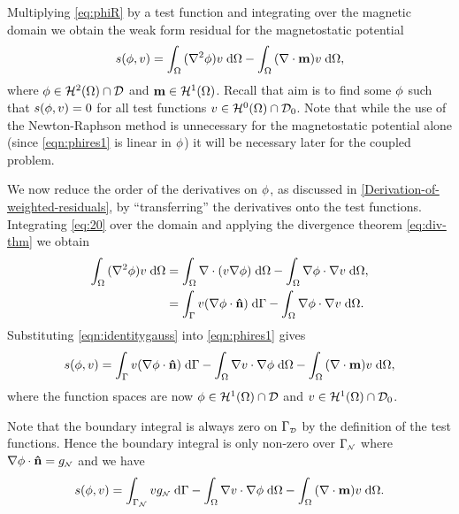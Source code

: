 {Multiplying \cref{eq:phiR} by a test function and integrating over the magnetic domain we obtain the weak form residual for the magnetostatic potential
\begin{gather}
  s(\phi, v) = {\int_{\Omega} { (\nabla^2 \phi) v } {\; \mathrm{{d}}} {\Omega}}
  - {\int_{\Omega} { (\nabla \cdot \boldsymbol{\mathrm{m}}) v} {\; \mathrm{{d}}} {\Omega}}, \label{eqn:phires1}
\end{gather}
where $\phi \in \mathcal{H}^2(\Omega) \cap \mathcal{D}$ and $\boldsymbol{\mathrm{m}} \in \mathcal{H}^1(\Omega)$.
Recall that aim is to find some $\phi$ such that $s(\phi, v) = 0$ for all test functions $v \in \mathcal{H}^0(\Omega) \cap \mathcal{D}_0$.
Note that while the use of the Newton-Raphson method is unnecessary for the magnetostatic potential alone (since \cref{eqn:phires1} is linear in $\phi$) it will be necessary later for the coupled problem.

We now reduce the order of the derivatives on $\phi$, as discussed in \cref{Derivation-of-weighted-residuals}, by ``transferring'' the derivatives onto the test functions.
Integrating \cref{eq:20} over the domain and applying the divergence theorem \cref{eq:div-thm} we obtain
\begin{equation}
  \begin{aligned}
    {\int_{\Omega} { (\nabla^2\phi) v} {\; \mathrm{{d}}}{\Omega}} &=  {\int_{\Omega} {\nabla \cdot (v \nabla \phi)} {\; \mathrm{{d}}} {\Omega}}
           - {\int_{\Omega} {\nabla \phi \cdot \nabla v} {\; \mathrm{{d}}} {\Omega}},\\
    &= {\int_{{\Gamma}} {v (\nabla \phi \cdot \boldsymbol{\mathrm{\hat{n}}})} {\; \mathrm{{d}}} {{\Gamma}}}
    - {\int_{\Omega} { \nabla \phi \cdot \nabla v} {\; \mathrm{{d}}} {\Omega}}.
    \label{eqn:identitygauss}
  \end{aligned}
\end{equation}
Substituting \cref{eqn:identitygauss} into \cref{eqn:phires1} gives
\begin{equation}
  s(\phi, v) = {\int_{{\Gamma}} { v (\nabla \phi \cdot \boldsymbol{\mathrm{\hat{n}}}) } {\; \mathrm{{d}}} {{\Gamma}}}
  - {\int_{\Omega} { \nabla v \cdot \nabla \phi } {\; \mathrm{{d}}} {\Omega}}
  - {\int_{\Omega} { (\nabla \cdot \boldsymbol{\mathrm{m}}) v } {\; \mathrm{{d}}} {\Omega}},
\end{equation}
where the function spaces are now $\phi \in \mathcal{H}^1(\Omega) \cap \mathcal{D}$ and $v \in \mathcal{H}^1(\Omega) \cap \mathcal{D}_0$.

Note that the boundary integral is always zero on ${\Gamma}_{\scriptscriptstyle{\mathcal{D}}}$ by the definition of the test functions.
Hence the boundary integral is only non-zero over ${\Gamma}_{{\scriptscriptstyle{\mathcal{N}}}}$ where $\nabla \phi \cdot \boldsymbol{\mathrm{\hat{n}}} = g_{{\scriptscriptstyle{\mathcal{N}}}}$ and we have
\begin{equation}
  s(\phi, v) = \int_{{\Gamma}_{\scriptscriptstyle{\mathcal{N}}}} v g_{\scriptscriptstyle{\mathcal{N}}} {\; \mathrm{{d}}} {\Gamma}
  - {\int_{\Omega} { \nabla v \cdot \nabla \phi} {\; \mathrm{{d}}} {\Omega}}
  - {\int_{\Omega} { (\nabla \cdot \boldsymbol{\mathrm{m}}) v} {\; \mathrm{{d}}} {\Omega}}.
  \label{res:contphi}
\end{equation}

}
